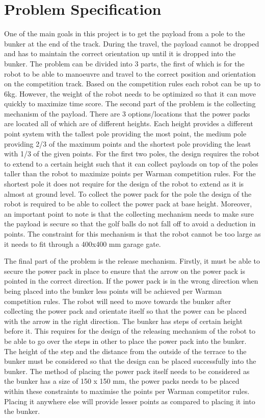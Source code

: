 \documentclass[12pt]{report}
\begin{document}
\section{Problem Specification} 
One of the main goals in this project is to get the payload from a pole to the bunker at the end of
the track. During the travel, the payload cannot be dropped and has to maintain the correct
orientation up until it is dropped into the bunker.
The problem can be divided into 3 parts, the first of which is for the robot to be able to
manoeuvre and travel to the correct position and orientation on the competition track. Based on
the competition rules each robot can be up to 6kg. However, the weight of the robot needs to be
optimized so that it can move quickly to maximize time score.
The second part of the problem is the collecting mechanism of the payload. There are 3
options/locations that the power packs are located all of which are of different heights. Each
height provides a different point system with the tallest pole providing the most point, the
medium pole providing 2/3 of the maximum points and the shortest pole providing the least with
1/3 of the given points. For the first two poles, the design requires the robot to extend to a certain
height such that it can collect payloads on top of the poles taller than the robot to maximize
points per Warman competition rules. For the shortest pole it does not require for the design of
the robot to extend as it is almost at ground level. To collect the power pack for the pole the
design of the robot is required to be able to collect the power pack at base height. Moreover, an
important point to note is that the collecting mechanism needs to make sure the payload is secure
so that the golf balls do not fall off to avoid a deduction in points. The constraint for this
mechanism is that the robot cannot be too large as it needs to fit through a 400x400 mm garage
gate.

The final part of the problem is the release mechanism. Firstly, it must be able to secure the
power pack in place to ensure that the arrow on the power pack is pointed in the correct
direction. If the power pack is in the wrong direction when being placed into the bunker less
points will be achieved per Warman competition rules. The robot will need to move towards the
bunker after collecting the power pack and orientate itself so that the power can be placed with
the arrow in the right direction. The bunker has steps of certain height before it. This requires for
the design of the releasing mechanism of the robot to be able to go over the steps in other to
place the power pack into the bunker. The height of the step and the distance from the outside of
the terrace to the bunker must be considered so that the design can be placed successfully into
the bunker. The method of placing the power pack itself needs to be considered as the bunker has
a size of 150 x 150 mm, the power packs needs to be placed within these constraints to maximise
the points per Warman competitor rules. Placing it anywhere else will provide lesser points as
compared to placing it into the bunker.
\end{document}

